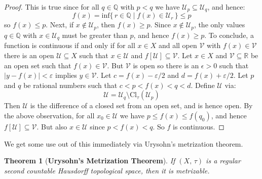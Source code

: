 \documentclass{article}
\theoremstyle{plain}
\newtheorem{theorem}{Theorem}[section]
\begin{document}
\begin{proof}
            This is true since for all $q\in\mathbb{Q}$ with $p<q$ we have
            $\mathcal{U}_{p}\subseteq\mathcal{U}_{q}$, and hence:
            \begin{equation}
                f(x)
                =\textrm{inf}\big\{\,r\in\mathbb{Q}\;|\;
                    f(x)\in\mathcal{U}_{r}\,\big\}
                \leq{p}
            \end{equation} 
            so $f(x)\leq{p}$. Next, if $x\notin\mathcal{U}_{p}$, then
            $f(x)\geq{p}$. Since $x\notin\mathcal{U}_{p}$, the only values
            $q\in\mathbb{Q}$ with $x\in\mathcal{U}_{q}$ must be greater than
            $p$, and hence $f(x)\geq{p}$. To conclude, a function
            is continuous if and only if for all $x\in{X}$ and all open
            $\mathcal{V}$ with $f(x)\in\mathcal{V}$ there is an open
            $\mathcal{U}\subseteq{X}$ such that $x\in\mathcal{U}$ and
            $f[\mathcal{U}]\subseteq\mathcal{V}$. Let $x\in{X}$ and
            $\mathcal{V}\subseteq\mathbb{R}$ be an open set such that
            $f(x)\in\mathcal{V}$. But $\mathcal{V}$ is open so there is an
            $\epsilon>0$ such that $|y-f(x)|<\varepsilon$ implies
            $y\in\mathcal{V}$. Let $c=f(x)-\varepsilon/2$ and
            $d=f(x)+\varepsilon/2$. Let $p$ and $q$ be rational numbers such
            that $c<p<f(x)<q<d$. Define $\mathcal{U}$ via:
            \begin{equation}
                \mathcal{U}=\mathcal{U}_{q}
                    \setminus\textrm{Cl}_{\tau}(\mathcal{U}_{p})
            \end{equation}
            Then $\mathcal{U}$ is the difference of a closed set from an open
            set, and is hence open. By the above observation, for all
            $x_{0}\in\mathcal{U}$ we have $p\leq{f}(x)\leq{f}(q_{0})$, and hence
            $f[\mathcal{U}]\subseteq\mathcal{V}$. But also
            $x\in\mathcal{U}$ since $p<f(x)<q$. So $f$ is continuous.
        \end{proof}
        We get some use out of this immediately via Urysohn's metrization
        theorem.
        \begin{theorem}[\textbf{Urysohn's Metrization Theorem}]
            If $(X,\,\tau)$ is a regular second countable Hausdorff topological
            space, then it is metrizable.
        \end{theorem}
\end{document}
